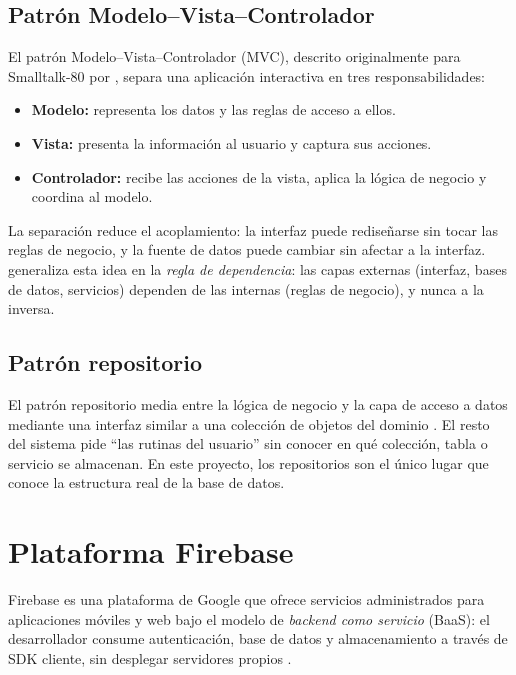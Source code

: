 \subsection{Patrón Modelo--Vista--Controlador}

El patrón Modelo--Vista--Controlador (MVC), descrito originalmente para
Smalltalk-80 por \citet{krasner1988}, separa una aplicación interactiva en tres
responsabilidades:

\begin{itemize}
    \item \textbf{Modelo:} representa los datos y las reglas de acceso a ellos.
    \item \textbf{Vista:} presenta la información al usuario y captura sus
    acciones.
    \item \textbf{Controlador:} recibe las acciones de la vista, aplica la
    lógica de negocio y coordina al modelo.
\end{itemize}

La separación reduce el acoplamiento: la interfaz puede rediseñarse sin tocar
las reglas de negocio, y la fuente de datos puede cambiar sin afectar a la
interfaz. \citet{martin2017} generaliza esta idea en la \emph{regla de
dependencia}: las capas externas (interfaz, bases de datos, servicios) dependen
de las internas (reglas de negocio), y nunca a la inversa.

\subsection{Patrón repositorio}

El patrón repositorio media entre la lógica de negocio y la capa de acceso a
datos mediante una interfaz similar a una colección de objetos del dominio
\citep{fowler2002}. El resto del sistema pide ``las rutinas del usuario'' sin
conocer en qué colección, tabla o servicio se almacenan. En este proyecto, los
repositorios son el único lugar que conoce la estructura real de la base de
datos.

\section{Plataforma Firebase}
\label{sec:mt-firebase}

Firebase es una plataforma de Google que ofrece servicios administrados para
aplicaciones móviles y web bajo el modelo de \emph{backend como servicio}
(BaaS): el desarrollador consume autenticación, base de datos y almacenamiento
a través de SDK cliente, sin desplegar servidores propios \citep{firebase}.

